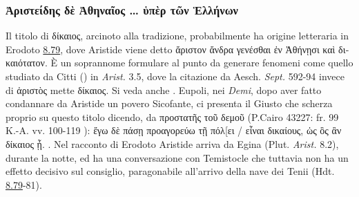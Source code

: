 {\subsubsection{\textgreek{Ἀριστείδης δὲ Ἀθηναῖος …   ὑπὲρ τῶν Ἑλλήνων}}
Il titolo di \textgreek{δίκαιος}, arcinoto alla tradizione, probabilmente ha origine letteraria in Erodoto \href{http://data.perseus.org/citations/urn:cts:greekLit:tlg0016.tlg001.perseus-grc1:8.79}{8.79}, dove Aristide viene detto \textgreek{ἄριστον ἄνδρα γενέσθαι ἐν  Ἀθήνῃσι καὶ δικαιότατον}. È un soprannome formulare al punto da generare fenomeni come quello studiato da Citti (\cite*[137]{Citti2004}) in \emph{Arist. }3.5, dove la citazione da Aesch. \emph{Sept.} 592-94 invece di \textgreek{ἀριστὸς} mette \textgreek{δίκαιος}. Si veda anche \cite[88]{Funaioli2007}. Eupoli, nei \emph{Demi}, dopo aver fatto condannare da Aristide un povero Sicofante, ci presenta il Giusto che scherza proprio su questo titolo dicendo, da \textgreek{προστατῆς τοῦ δεμοῦ}  (P.Cairo 43227: fr. 99 K.-A. vv. 100-119 ): \textgreek{ἔγω δὲ πάσῃ προαγορεύω τῇ πόλ[ει / εἶναι δικαίους, ὡς ὃς ἂν δίκαιος ᾖ.} \cite[275s]{Telo2006}.
    Nel racconto di Erodoto Aristide arriva da Egina (Plut. \emph{Arist. }8.2), 
    durante la notte, ed ha una conversazione con Temistocle che tuttavia non ha un effetto decisivo sul consiglio, paragonabile all'arrivo della nave dei Tenii (Hdt. \href{http://data.perseus.org/citations/urn:cts:greekLit:tlg0016.tlg001.perseus-grc1:8.79}{8.79}-81). 
}
